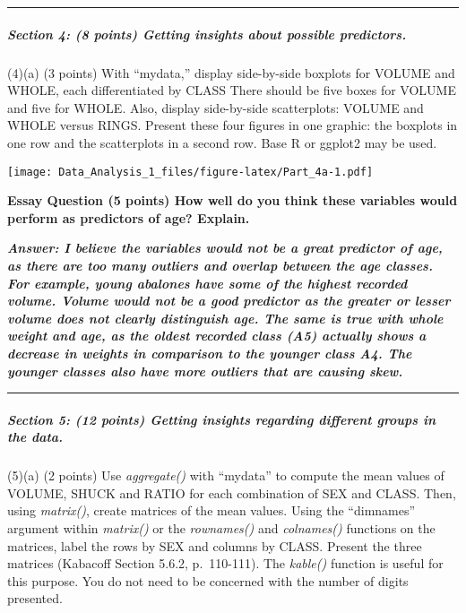\documentclass[
]{article}
\begin{document}
\begin{center}\rule{0.5\linewidth}{0.5pt}\end{center}

\hypertarget{section-4-8-points-getting-insights-about-possible-predictors.}{%
\subparagraph{Section 4: (8 points) Getting insights about possible
predictors.}\label{section-4-8-points-getting-insights-about-possible-predictors.}}

(4)(a) (3 points) With ``mydata,'' display side-by-side boxplots for
VOLUME and WHOLE, each differentiated by CLASS There should be five
boxes for VOLUME and five for WHOLE. Also, display side-by-side
scatterplots: VOLUME and WHOLE versus RINGS. Present these four figures
in one graphic: the boxplots in one row and the scatterplots in a second
row. Base R or ggplot2 may be used.

\texttt{[image: Data\_Analysis\_1\_files/figure-latex/Part\_4a-1.pdf]}

\textbf{Essay Question (5 points) How well do you think these variables
would perform as predictors of age? Explain.}

\textbf{\emph{Answer: I believe the variables would not be a great
predictor of age, as there are too many outliers and overlap between the
age classes. For example, young abalones have some of the highest
recorded volume. Volume would not be a good predictor as the greater or
lesser volume does not clearly distinguish age. The same is true with
whole weight and age, as the oldest recorded class (A5) actually shows a
decrease in weights in comparison to the younger class A4. The younger
classes also have more outliers that are causing skew. }}

\begin{center}\rule{0.5\linewidth}{0.5pt}\end{center}

\hypertarget{section-5-12-points-getting-insights-regarding-different-groups-in-the-data.}{%
\subparagraph{Section 5: (12 points) Getting insights regarding
different groups in the
data.}\label{section-5-12-points-getting-insights-regarding-different-groups-in-the-data.}}

(5)(a) (2 points) Use \emph{aggregate()} with ``mydata'' to compute the
mean values of VOLUME, SHUCK and RATIO for each combination of SEX and
CLASS. Then, using \emph{matrix()}, create matrices of the mean values.
Using the ``dimnames'' argument within \emph{matrix()} or the
\emph{rownames()} and \emph{colnames()} functions on the matrices, label
the rows by SEX and columns by CLASS. Present the three matrices
(Kabacoff Section 5.6.2, p.~110-111). The \emph{kable()} function is
useful for this purpose. You do not need to be concerned with the number
of digits presented.
\end{document}
